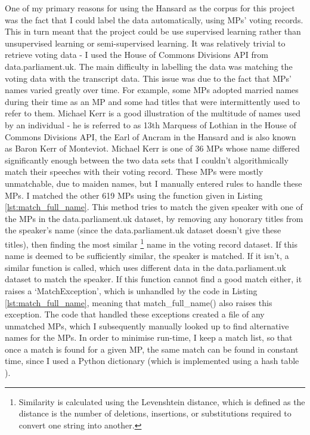 \documentclass[12pt,a4paper,twoside,openright]{report}
\begin{document}
One of my primary reasons for using the Hansard as the corpus for this project was the fact that I could label the data automatically, using MPs' voting records. This in turn meant that the project could be use supervised learning rather than unsupervised learning or semi-supervised learning. It was relatively trivial to retrieve voting data - I used the House of Commons Divisions API from data.parliament.uk. The main difficulty in labelling the data was matching the voting data with the transcript data. This issue was due to the fact that MPs' names varied greatly over time. For example, some MPs adopted married names during their time as an MP and some had titles that were intermittently used to refer to them. Michael Kerr is a good illustration of the multitude of names used by an individual - he is referred to as 13th Marquess of Lothian in the House of Commons Divisions API, the Earl of Ancram in the Hansard and is also known as Baron Kerr of Monteviot. Michael Kerr is one of 36 MPs whose name differed significantly enough between the two data sets that I couldn't algorithmically match their speeches with their voting record. These MPs were mostly unmatchable, due to maiden names, but I manually entered rules to handle these MPs. I matched the other 619 MPs using the function given in Listing \ref{lst:match_full_name}. This method tries to match the given speaker with one of the MPs in the data.parliament.uk dataset, by removing any honorary titles from the speaker's name (since the data.parliament.uk dataset doesn't give these titles), then finding the most similar \footnote{Similarity is calculated using the Levenshtein distance, which is defined as the distance is the number of deletions, insertions, or substitutions required to convert one string into another.} name in the voting record dataset. If this name is deemed to be sufficiently similar, the speaker is matched. If it isn't, a similar function is called, which uses different data in the data.parliament.uk dataset to match the speaker. If this function cannot find a good match either, it raises a `MatchException', which is unhandled by the code in Listing \ref{lst:match_full_name}, meaning that match\_full\_name() also raises this exception. The code that handled these exceptions created a file of any unmatched MPs, which I subsequently manually looked up to find alternative names for the MPs. In order to minimise run-time, I keep a match list, so that once a match is found for a given MP, the same match can be found in constant time, since I used a Python dictionary (which is implemented using a hash table \cite{pythonfaqs}).
\end{document}
